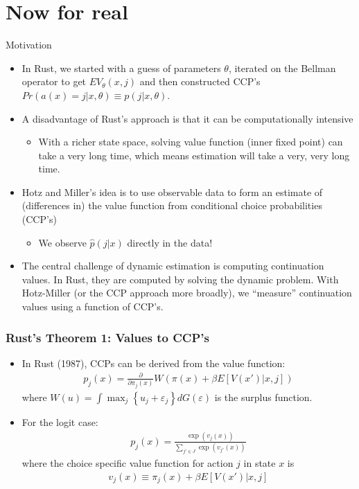 \documentclass[xcolor=pdftex,dvipsnames,table,mathserif,aspectratio=169]{beamer}
\begin{document}
\section*{Now for real}


\begin{frame}{Motivation}
\begin{itemize}
	\item In Rust, we started with a guess of parameters $\theta$, iterated on the Bellman operator to get $EV_{\theta}(x,j)$ and then constructed CCP's $Pr(a(x) = j | x,\theta) \equiv p(j | x,\theta)$.
	\item A disadvantage of Rust's approach is that it can be computationally intensive
	\begin{itemize}
		\item With a richer state space, solving value function (inner fixed point) 
		can take a very long time,
		which means estimation will take a very, very long time.
	\end{itemize}
	\item Hotz and Miller's idea is to use observable data to form an estimate 
	of (differences in) the value function from conditional choice probabilities (CCP's)
\begin{itemize}
\item We observe $\hat{p}(j | x)$ directly in the data!
\end{itemize}
	\item The central challenge of dynamic estimation is computing continuation values. 
	In Rust, they are computed by solving the dynamic problem.
	With Hotz-Miller (or the CCP approach more broadly), we ``measure'' continuation
	values using a function of CCP's.
	
\end{itemize}
\end{frame}

\begin{frame}
\frametitle{Rust's Theorem 1: Values to CCP's}
\begin{itemize}
	\item In Rust (1987), CCPs can be derived from the value function:
	\begin{align*}
		p_{j}\left( x\right) = \frac{\partial}{\partial \pi_{j} \left(x \right)} W\left( \pi\left( x \right) 
		+\beta E\left[V\left(x' \right)|x,j\right]\right)
	\end{align*}
	where  
	$W\left(u\right) = \int \max_{j} \left\{ u_{j} +\varepsilon_{j}\right\}dG\left( \varepsilon\right)$
	is the surplus function.
	\medskip
	\item For the logit case:
	\begin{align*}
	p_{j}\left(x\right) = \frac{\exp\left(v_{j}\left(x\right)\right)}{\sum_{j'\in J}\exp\left(v_{j'}\left(x\right)\right)}
	\end{align*}
	where the choice specific value function for action $j$ in state $x$ is 
	\begin{align*}
	v_{j}\left(x\right) \equiv \pi_{j}\left(x\right)+\beta E\left[V\left(x' \right)|x,j\right]
	\end{align*}
\end{itemize}
\end{frame}
\end{document}
